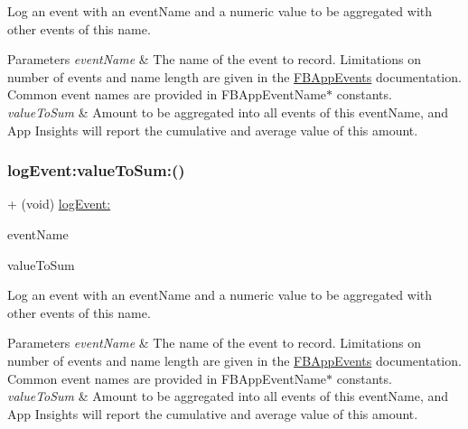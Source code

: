 Log an event with an event\+Name and a numeric value to be aggregated with other events of this name.


\begin{DoxyParams}{Parameters}
{\em event\+Name} & The name of the event to record. Limitations on number of events and name length are given in the {\ttfamily \hyperlink{interfaceFBAppEvents}{F\+B\+App\+Events}} documentation. Common event names are provided in {\ttfamily F\+B\+App\+Event\+Name$\ast$} constants.\\
\hline
{\em value\+To\+Sum} & Amount to be aggregated into all events of this event\+Name, and App Insights will report the cumulative and average value of this amount. \\
\hline
\end{DoxyParams}
\mbox{\label{interfaceFBAppEvents_a9ac18622973fab340ecf25c63c933a34}} 
\subsubsection{\texorpdfstring{log\+Event\+:value\+To\+Sum\+:()}{logEvent:valueToSum:()}\hspace{0.1cm}{\footnotesize\ttfamily [4/5]}}
{\footnotesize\ttfamily + (void) \hyperlink{interfaceFBAppEvents_a816373dd50bcf7381bf8194758ef8441}{log\+Event\+:} \begin{DoxyParamCaption}\item[{(N\+S\+String $\ast$)}]{event\+Name }\item[{valueToSum:(double)}]{value\+To\+Sum }\end{DoxyParamCaption}}

Log an event with an event\+Name and a numeric value to be aggregated with other events of this name.


\begin{DoxyParams}{Parameters}
{\em event\+Name} & The name of the event to record. Limitations on number of events and name length are given in the {\ttfamily \hyperlink{interfaceFBAppEvents}{F\+B\+App\+Events}} documentation. Common event names are provided in {\ttfamily F\+B\+App\+Event\+Name$\ast$} constants.\\
\hline
{\em value\+To\+Sum} & Amount to be aggregated into all events of this event\+Name, and App Insights will report the cumulative and average value of this amount. \\
\hline
\end{DoxyParams}
\mbox{\label{interfaceFBAppEvents_a9ac18622973fab340ecf25c63c933a34}} 
